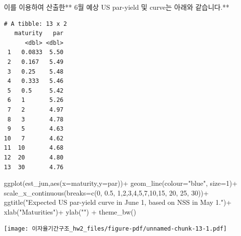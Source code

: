 \documentclass[
  a4paper,
  DIV=11,
  numbers=noendperiod]{scrreprt}
\newenvironment{Shaded}{\begin{snugshade}}{\end{snugshade}}
\newcommand{\AttributeTok}[1]{\textcolor[rgb]{0.40,0.45,0.13}{#1}}
\newcommand{\DecValTok}[1]{\textcolor[rgb]{0.68,0.00,0.00}{#1}}
\newcommand{\FloatTok}[1]{\textcolor[rgb]{0.68,0.00,0.00}{#1}}
\newcommand{\FunctionTok}[1]{\textcolor[rgb]{0.28,0.35,0.67}{#1}}
\newcommand{\NormalTok}[1]{\textcolor[rgb]{0.00,0.23,0.31}{#1}}
\newcommand{\OtherTok}[1]{\textcolor[rgb]{0.00,0.23,0.31}{#1}}
\newcommand{\SpecialCharTok}[1]{\textcolor[rgb]{0.37,0.37,0.37}{#1}}
\newcommand{\StringTok}[1]{\textcolor[rgb]{0.13,0.47,0.30}{#1}}
\begin{document}
이를 이용하여 산출한** 6월 예상 US par-yield 및 curve는 아래와
같습니다.**

\begin{Shaded}
\end{Shaded}

\begin{verbatim}
# A tibble: 13 x 2
   maturity   par
      <dbl> <dbl>
 1   0.0833  5.50
 2   0.167   5.49
 3   0.25    5.48
 4   0.333   5.46
 5   0.5     5.42
 6   1       5.26
 7   2       4.97
 8   3       4.78
 9   5       4.63
10   7       4.62
11  10       4.68
12  20       4.80
13  30       4.76
\end{verbatim}

\begin{Shaded}
\begin{Highlighting}[]
\FunctionTok{ggplot}\NormalTok{(est\_jun,}\FunctionTok{aes}\NormalTok{(}\AttributeTok{x=}\NormalTok{maturity,}\AttributeTok{y=}\NormalTok{par))}\SpecialCharTok{+}
  \FunctionTok{geom\_line}\NormalTok{(}\AttributeTok{colour=}\StringTok{"blue"}\NormalTok{, }\AttributeTok{size=}\DecValTok{1}\NormalTok{)}\SpecialCharTok{+}
  \FunctionTok{scale\_x\_continuous}\NormalTok{(}\AttributeTok{breaks=}\FunctionTok{c}\NormalTok{(}\DecValTok{0}\NormalTok{, }\FloatTok{0.5}\NormalTok{, }\DecValTok{1}\NormalTok{,}\DecValTok{2}\NormalTok{,}\DecValTok{3}\NormalTok{,}\DecValTok{4}\NormalTok{,}\DecValTok{5}\NormalTok{,}\DecValTok{7}\NormalTok{,}\DecValTok{10}\NormalTok{,}\DecValTok{15}\NormalTok{, }\DecValTok{20}\NormalTok{, }\DecValTok{25}\NormalTok{, }\DecValTok{30}\NormalTok{))}\SpecialCharTok{+}
  \FunctionTok{ggtitle}\NormalTok{(}\StringTok{"Expected US par{-}yield curve in June 1, based on NSS in May 1."}\NormalTok{)}\SpecialCharTok{+}
  \FunctionTok{xlab}\NormalTok{(}\StringTok{"Maturities"}\NormalTok{)}\SpecialCharTok{+}
  \FunctionTok{ylab}\NormalTok{(}\StringTok{""}\NormalTok{) }\SpecialCharTok{+} 
  \FunctionTok{theme\_bw}\NormalTok{()}
\end{Highlighting}
\end{Shaded}

\texttt{[image: 이자율기간구조\_hw2\_files/figure-pdf/unnamed-chunk-13-1.pdf]}
\end{document}
